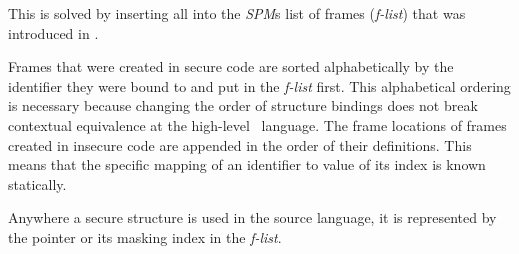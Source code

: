 This is solved by inserting all  into the \emph{SPM}s list of frames (\emph{f-list}) that was introduced in . 

Frames that were created in secure code are sorted alphabetically by the identifier they were bound to and put in the \emph{f-list} first.
This alphabetical ordering is necessary because changing the order of structure bindings does not break contextual equivalence at the high-level \MiniML\ language.
The frame locations of frames created in insecure code are appended in the order of their definitions.
This means that the specific mapping of an identifier to value of its index is known statically.

Anywhere a secure structure is used in the source language, it is represented by the  pointer or its masking index in the \emph{f-list}.


